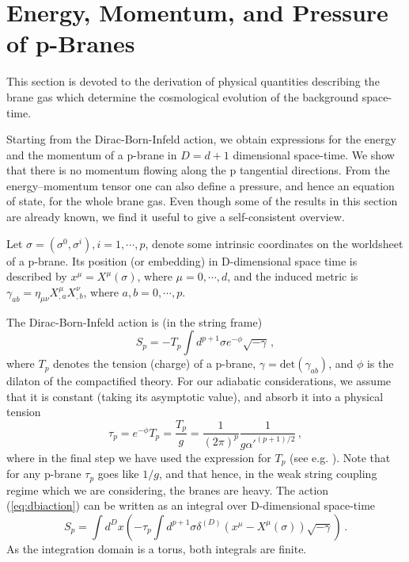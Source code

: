 \documentclass[a4paper,twocolumn,nofootinbib,tightenlines,prd,aps,
               superscriptaddress]{revtex4} %
\newcommand{\si}{\sigma}
\newcommand{\ga}{\gamma}
\begin{document}


\section{Energy, Momentum, and Pressure of  p-Branes}
\label{sec:energy}

This section is devoted to the derivation of physical quantities
describing the brane gas which determine the cosmological
evolution of the background space-time.

Starting from the Dirac-Born-Infeld action, we obtain expressions
for the energy and the momentum of a p-brane in $D=d+1$
dimensional space-time. We show that there is no momentum flowing
along the p tangential directions. From the energy--momentum
tensor one can also define a pressure, and hence an equation of
state, for the whole brane gas.
Even though some of the results in this section are already known,
we find it useful to give a self-consistent overview.

Let $\si=(\si^0,\si^i), i=1,\cdots,p$, denote some intrinsic
coordinates on the worldsheet of a p-brane. Its position (or
embedding) in D-dimensional space time is described by
$x^{\mu}=X^{\mu}(\si)$, where $\mu=0,\cdots,d$, and the induced
metric is $\ga_{ab}=\eta_{\mu\nu} X^\mu_{,a} X^\nu_{,b}$, where
$a,b = 0,\cdots,p$.

The Dirac-Born-Infeld action is (in the string frame)
\begin{equation} \label{eq:dbiaction}
    S_p = -T_p \int d^{p+1}\si e^{-\phi}\sqrt{-\ga} \, ,
\end{equation}
where $T_p$ denotes the tension (charge) of a p-brane,
$\ga=\mbox{det}(\ga_{ab})$, and $\phi$ is the dilaton of the
compactified theory. For our adiabatic considerations, we assume
that it is  constant (taking its asymptotic value), and absorb it
into a physical tension
\begin{equation} \label{eq:tension}
     \tau_p = e^{-\phi}T_p = \frac{T_p}{g} =
            \frac{1}{(2\pi)^p}\frac{1}{g\alpha'^{(p+1)/2}} \, ,
\end{equation}
where in the final step we have used the expression for $T_p$ (see
e.g. \cite{Polchinski:1998rr}). Note that for any p-brane $\tau_p$
goes like $1/g$, and that hence, in the weak string coupling
regime which we are considering, the branes are heavy.  The action
(\ref{eq:dbiaction}) can be written as an integral over
D-dimensional space-time
\begin{equation} \label{eq:10Daction}
    S_p=\int d^{D}x \left(-\tau_p \int d^{p+1}\si \delta^{(D)}(x^\mu-X^\mu(\si))\sqrt{-\ga}
    \right)\,.
\end{equation}
As the integration domain is a torus, both integrals are finite.
\end{document}
